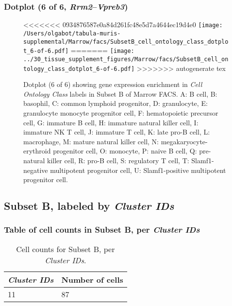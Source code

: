 \clearpage

\subsubsection{Dotplot (6 of 6, \emph{Rrm2}--\emph{Vpreb3})}
\begin{figure}[h]
\centering
<<<<<<< 0934876587e0a84d261fc48e5d7a4644ec19d4e0
\texttt{[image: /Users/olgabot/tabula-muris-supplemental/Marrow/facs/SubsetB\_cell\_ontology\_class\_dotplot\_6-of-6.pdf]}
=======
\texttt{[image: ../30\_tissue\_supplement\_figures/Marrow/facs/SubsetB\_cell\_ontology\_class\_dotplot\_6-of-6.pdf]}
>>>>>>> autogenerate tex

\caption{ Dotplot (6 of 6)  showing gene expression enrichment in \emph{Cell Ontology Class} labels in Subset B of Marrow FACS. A: B cell, B: basophil, C: common lymphoid progenitor, D: granulocyte, E: granulocyte monocyte progenitor cell, F: hematopoietic precursor cell, G: immature B cell, H: immature natural killer cell, I: immature NK T cell, J: immature T cell, K: late pro-B cell, L: macrophage, M: mature natural killer cell, N: megakaryocyte-erythroid progenitor cell, O: monocyte, P: naive B cell, Q: pre-natural killer cell, R: pro-B cell, S: regulatory T cell, T: Slamf1-negative multipotent progenitor cell, U: Slamf1-positive multipotent progenitor cell.}
\end{figure}


\clearpage

\subsection{Subset B, labeled by \emph{Cluster IDs}}
\subsubsection{Table of cell counts in Subset B, per \emph{Cluster IDs}}\begin{table}[h]
\centering
\label{my-label}
\begin{tabular}{@{}ll@{}}
\toprule

\emph{Cluster IDs}& Number of cells \\ \midrule
11 & 87 \\
\bottomrule
\end{tabular}
\caption{Cell counts for Subset B, per \emph{Cluster IDs}.}
\end{table}

\clearpage
